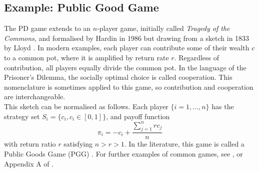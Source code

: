 \subsection{Example: Public Good Game} \label{PGG} \label{ToTC}

The PD game extends to an $n$-player game, initially called \emph{Tragedy of the Commons}, and formalised by Hardin in 1986 but drawing from a sketch in 1833 by Lloyd \cite{RN82}. In modern examples, each player can contribute some of their wealth $c$ to a common pot, where it is amplified by return rate  $r$. Regardless of contribution, all players equally divide the common pot. In the language of the Prisoner's Dilemma, the socially optimal choice is called cooperation. This nomenclature is sometimes applied to this game, so contribution and cooperation are interchangeable. \\

This sketch can be normalised as follows. Each player $\{ i = 1,\dots,n\}$ has the strategy set $S_i = \{c_i, c_i \in [0,1] \}$, and payoff function $$\pi_i = -c_i + \frac{\sum_{j =1}^n r c_j}{n}$$ with return ratio $r$ satisfying $n>r>1$. In the literature, this game is called a Public Goods Game (PGG) \cite{RN67}. For further examples of common games, see \cite{RN79}, or Appendix A of \cite{RN99}.  \\






